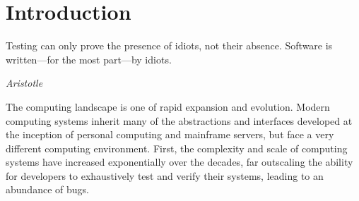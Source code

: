 \chapter{Introduction}
\epigraph{Testing can only prove the presence of idiots, not their absence. Software is written---for the most part---by idiots.}%
         {\textit{Aristotle}}


The computing landscape is one of rapid expansion and evolution.
Modern computing systems inherit many of the abstractions and interfaces
developed at the inception of personal computing and mainframe servers,
but face a very different computing environment.
First, the complexity and scale of computing systems have increased 
exponentially over the decades, far outscaling the ability for developers to 
exhaustively test and verify their systems, leading to an abundance of bugs.
